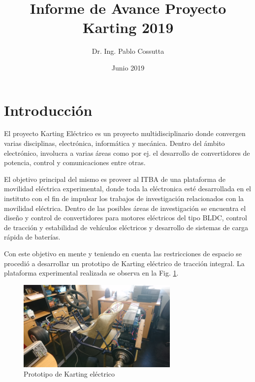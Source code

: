 \documentclass[a4]{article}
\title{Informe de Avance Proyecto Karting 2019}
\author{Dr. Ing. Pablo Cossutta}
\date{Junio 2019}
\begin{document}
\maketitle
%
\section{Introducción}
El proyecto Karting Eléctrico es un proyecto multidisciplinario donde convergen varias disciplinas, electrónica, informática y mecánica. Dentro del ámbito electrónico, involucra a varias áreas como por ej. el desarrollo de convertidores de potencia, control y comunicaciones entre otras.

El objetivo principal del mismo es proveer al ITBA de una plataforma de movilidad eléctrica experimental, donde toda la eléctronica esté desarrollada en el instituto con el fin de impulsar los trabajos de investigación relacionados con la movilidad eléctrica. Dentro de las posibles áreas de investigación se encuentra el diseño y control de convertidores para motores eléctricos del tipo BLDC, control de tracción y estabilidad de vehículos eléctricos y desarrollo de sistemas de carga rápida de baterías.

Con este objetivo en mente y teniendo en cuenta las restricciones de espacio se procedió a desarrollar un prototipo de Karting eléctrico de tracción integral. La plataforma experimental realizada se observa en la Fig. \ref{fig:kart1}.
\begin{figure}[h]
    \centering
    \includegraphics[width=0.7\textwidth]{figs/kart1.jpg}
    \caption{Prototipo de Karting eléctrico}
    \label{fig:kart1}
\end{figure}
\end{document}
